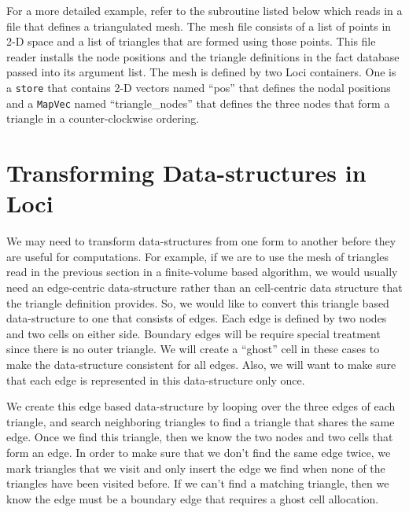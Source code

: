 \documentclass[10pt,epsf]{book}
\begin{document}
For a more detailed example, refer to the subroutine listed below
which reads in a file that defines a triangulated mesh.  The mesh file
consists of a list of points in 2-D space and a list of triangles that
are formed using those points.  This file reader installs the node
positions and the triangle definitions in the fact database passed
into its argument list.  The mesh is defined by two Loci containers.
One is a {\tt store} that contains 2-D vectors named ``pos'' that
defines the nodal positions and a {\tt MapVec} named
``triangle\_nodes'' that defines the three nodes that form a triangle
in a counter-clockwise ordering.



\section{Transforming Data-structures in Loci}

We may need to transform data-structures from one form to another
before they are useful for computations.  For example, if we are
to use the mesh of triangles read in the previous section in a
finite-volume based algorithm, we would usually need an edge-centric
data-structure rather than an cell-centric data structure that the
triangle definition provides.  So, we would like to convert this
triangle based data-structure to one that consists of edges.  Each
edge is defined by two nodes and two cells on either side.  Boundary
edges will be require special treatment since there is no outer
triangle.  We will create a ``ghost'' cell in these cases to make the
data-structure consistent for all edges.  Also, we will want to make
sure that each edge is represented in this data-structure only once.

We create this edge based data-structure by looping over the three
edges of each triangle, and search neighboring triangles to find a
triangle that shares the same edge.  Once we find this triangle, then
we know the two nodes and two cells that form an edge.  In order to
make sure that we don't find the same edge twice, we mark triangles
that we visit and only insert the edge we find when none of the
triangles have been visited before.  If we can't find a matching
triangle, then we know the edge must be a boundary edge that requires
a ghost cell allocation.
\end{document}
